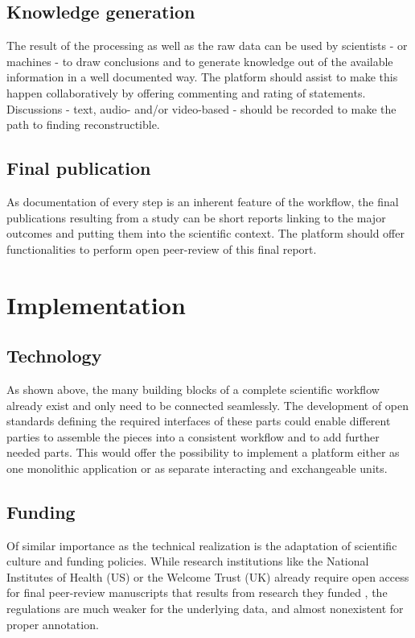 \documentclass{article}
\begin{document}
\subsection{Knowledge generation}

The result of the processing as well as the raw data can be used by
scientists - or machines \cite{Schmidt} - to draw conclusions and to generate
knowledge out of the available information in a well documented
way. The platform should assist to make this happen collaboratively by
offering commenting and rating of statements. Discussions - text,
audio- and/or video-based - should be recorded to make the path to
finding reconstructible.

\subsection{Final publication}

As documentation of every step is an inherent feature of the workflow,
the final publications resulting from a study can be short reports
linking to the major outcomes and putting them into the scientific
context. The platform should offer functionalities to perform open
peer-review of this final report.

\section{Implementation}

\subsection{Technology}

As shown above, the many building blocks of a complete scientific
workflow already exist and only need to be connected seamlessly. The
development of open standards defining the required interfaces of
these parts could enable different parties to assemble the pieces into
a consistent workflow and to add further needed parts. This would
offer the possibility to implement a platform either as one monolithic
application or as separate interacting and exchangeable units.

\subsection{Funding}

Of similar importance as the technical realization is the adaptation
of scientific culture and funding policies. While research
institutions like the National Institutes of Health (US) or the
Welcome Trust (UK) already require open access for final peer-review
manuscripts that results from research they funded \cite{NIH, Welcome}, the
regulations are much weaker for the underlying data, and almost
nonexistent for proper annotation.
\end{document}
